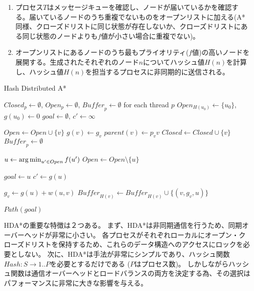\begin{enumerate}
	\item 
		プロセス$T$はメッセージキューを確認し、ノードが届いているかを確認する。届いているノードのうち重複でないものをオープンリストに加える(A*同様、クローズドリストに同じ状態が存在しないか、クローズドリストにある同じ状態のノードよりも$f$値が小さい場合に重複でない)。
	\item 
		オープンリストにあるノードのうち最もプライオリティ($f$値)の高いノードを展開する。生成されたそれぞれのノード$n$についてハッシュ値$H(n)$を計算し、ハッシュ値$H(n)$を担当するプロセスに非同期的に送信される。
\end{enumerate}


\begin{algorithm}
  \caption{Hash Distributed A*}
  $Closed_p \leftarrow \emptyset$, $Open_p \leftarrow \emptyset$, $\mathit{Buffer}_p \leftarrow \emptyset$ for each thread $p$\;
  $Open_{H(u_0)} \leftarrow \{u_0\}$, $g(u_0) \leftarrow 0$\;
  $goal \leftarrow \emptyset$, $c' \leftarrow \infty$\;

   {
   {
     {
       {
        $Open \leftarrow Open \cup \{v\}$\;
	$g(v) \leftarrow g_v$\;
        $parent(v) \leftarrow p_vv$\;
      }
       {
        $Closed \leftarrow Closed \cup \{v\}$\;
      }
    }
    $\mathit{Buffer}_p \leftarrow \emptyset$\;
     {
      $u \leftarrow \operatorname*{arg\,min}_{u' \in Open} f(u')$ \;
      $Open \leftarrow Open \setminus \{u\} $\;

       {
        $goal \leftarrow u$\;
        $c' \leftarrow g(u)$\;        
      }

       {
        $g_v \leftarrow g(u) + w(u, v)$\;
        $\mathit{Buffer}_{H(v)} \leftarrow \mathit{Buffer}_{H(v)} \cup \{(v, g_v, u)\}$\;
      }
    }
  }
  \Return $Path(goal)$\;
  }
  \label{alg:hdastar}
\end{algorithm}

HDA*の重要な特徴は２つある。
まず、HDA*は非同期通信を行うため、同期オーバーヘッドが非常に小さい。
各プロセスがそれぞれローカルにオープン・クローズドリストを保持するため、これらのデータ構造へのアクセスにロックを必要としない。
次に、HDA*は手法が非常にシンプルであり、ハッシュ関数$Hash: S \rightarrow {1..P}$を必要とするだけである ($P$はプロセス数)。
しかしながらハッシュ関数は通信オーバーヘッドとロードバランスの両方を決定する為、その選択はパフォーマンスに非常に大きな影響を与える。

